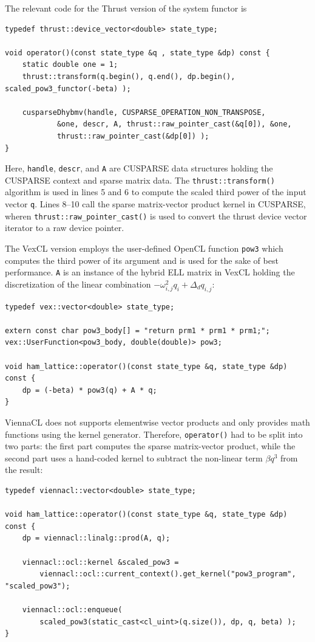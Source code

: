 \documentclass[final]{siamltex}
\newcommand{\code}[1]{\lstinline|#1|}
\begin{document}
The relevant code for the Thrust version of the system functor is
\begin{lstlisting}
typedef thrust::device_vector<double> state_type;

void operator()(const state_type &q , state_type &dp) const {
    static double one = 1;
    thrust::transform(q.begin(), q.end(), dp.begin(), scaled_pow3_functor(-beta) );

    cusparseDhybmv(handle, CUSPARSE_OPERATION_NON_TRANSPOSE,
            &one, descr, A, thrust::raw_pointer_cast(&q[0]), &one,
            thrust::raw_pointer_cast(&dp[0]) );
}
\end{lstlisting}
Here, \code{handle}, \code{descr}, and \code{A} are CUSPARSE data structures
holding the CUSPARSE context and sparse matrix data. The
\code{thrust::transform()} algorithm is used in lines 5 and 6 to compute the scaled
third power of the input vector \code{q}. Lines 8--10 call the sparse matrix-vector product kernel in CUSPARSE,
wheren \code{thrust::raw_pointer_cast()} is used to convert the thrust device
vector iterator to a raw device pointer.

The VexCL version employs the user-defined OpenCL function \code{pow3} which
computes the third power of its argument and is used for the sake of best performance.
\code{A} is an instance of the hybrid ELL matrix in VexCL
holding the discretization of the linear combination $- \omega_{i,j}^2 q_i + \Delta_d q_{i,j}$:
\begin{lstlisting}
typedef vex::vector<double> state_type;

extern const char pow3_body[] = "return prm1 * prm1 * prm1;";
vex::UserFunction<pow3_body, double(double)> pow3;

void ham_lattice::operator()(const state_type &q, state_type &dp) const {
    dp = (-beta) * pow3(q) + A * q;
}
\end{lstlisting}

ViennaCL does not supports elementwise vector products and only provides
math functions using the kernel generator. Therefore,
\code{operator()} had to be split into two parts: the first part computes
the sparse matrix-vector product, while the second part uses a hand-coded kernel to
subtract the non-linear term $\beta q^3$ from the result:
\begin{lstlisting}
typedef viennacl::vector<double> state_type;

void ham_lattice::operator()(const state_type &q, state_type &dp) const {
    dp = viennacl::linalg::prod(A, q);

    viennacl::ocl::kernel &scaled_pow3 =
        viennacl::ocl::current_context().get_kernel("pow3_program", "scaled_pow3");

    viennacl::ocl::enqueue(
        scaled_pow3(static_cast<cl_uint>(q.size()), dp, q, beta) );
}
\end{lstlisting}
\end{document}
